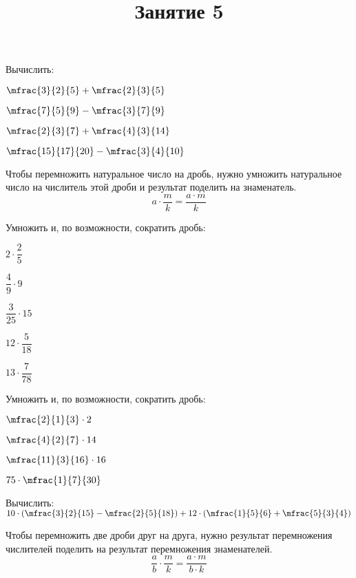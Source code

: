 %	
\setcounter{definit}{0}
\newpage
\title{Занятие 5}
\begin{listofex}
	\item Вычислить:
	\begin{enumcols}[itemcolumns=4]
		\item \( \mfrac{3}{2}{5}+\mfrac{2}{3}{5} \)
		\item \( \mfrac{7}{5}{9}-\mfrac{3}{7}{9} \)
		\item \( \mfrac{2}{3}{7}+\mfrac{4}{3}{14} \)
		\item \( \mfrac{15}{17}{20}-\mfrac{3}{4}{10} \)
	\end{enumcols}
\end{listofex}
\begin{definit}
	Чтобы перемножить натуральное число на дробь, нужно умножить натуральное число на числитель этой дроби и результат поделить на знаменатель.
	\[ a\cdot\dfrac{m}{k}=\dfrac{a\cdot m}{k} \]
\end{definit}
\begin{listofex}
	\item Умножить и, по возможности, сократить дробь:
	\begin{enumcols}[itemcolumns=5]
		\item \( 2\cdot\dfrac{2}{5} \)
		\item \( \dfrac{4}{9}\cdot9 \)
		\item \( \dfrac{3}{25}\cdot15 \)
		\item \( 12\cdot\dfrac{5}{18} \)
		\item \( 13\cdot\dfrac{7}{78} \)
	\end{enumcols}
	\item Умножить и, по возможности, сократить дробь:
	\begin{enumcols}[itemcolumns=4]
		\item \( \mfrac{2}{1}{3}\cdot2\)
		\item \( \mfrac{4}{2}{7}\cdot14 \)
		\item \( \mfrac{11}{3}{16}\cdot16 \)
		\item \( 75\cdot\mfrac{1}{7}{30} \)
	\end{enumcols}
	\item Вычислить: \( 10\cdot\left( \mfrac{3}{2}{15}-\mfrac{2}{5}{18} \right)+12\cdot\left( \mfrac{1}{5}{6}+\mfrac{5}{3}{4} \right) \)
\end{listofex}
\begin{definit}
	Чтобы перемножить две дроби друг на друга, нужно результат перемножения числителей поделить на результат перемножения знаменателей.
	\[ \dfrac{a}{b}\cdot\dfrac{m}{k}=\dfrac{a\cdot m}{b\cdot k} \]
\end{definit}
